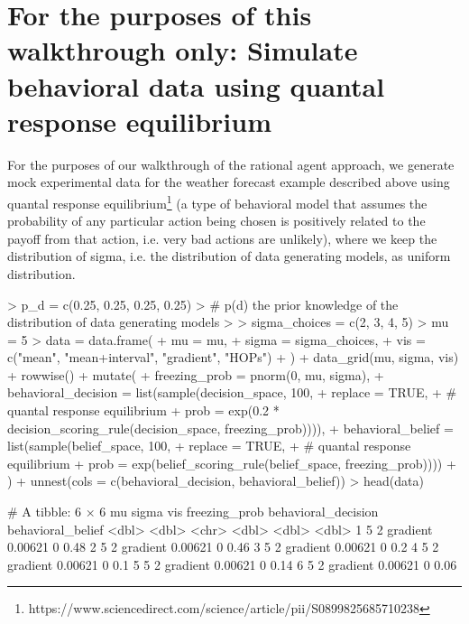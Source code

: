 \documentclass{article}
\begin{document}
\section{For the purposes of this walkthrough only: Simulate behavioral data using quantal response equilibrium}

For the purposes of our walkthrough of the rational agent approach, we generate mock experimental data for the weather forecast example described above using quantal response equilibrium\footnote{https://www.sciencedirect.com/science/article/pii/S0899825685710238} (a type of behavioral model that assumes the probability of any particular action being chosen is positively related to the payoff from that action, i.e. very bad actions are unlikely), where we keep the distribution of sigma, i.e. the distribution of data generating models, as uniform distribution.

\begin{Schunk}
\begin{Sinput}
> p_d = c(0.25, 0.25, 0.25, 0.25)
> # p(d) the prior knowledge of the distribution of data generating models
> 
> sigma_choices = c(2, 3, 4, 5)
> mu = 5
> data = data.frame(
+   mu = mu, 
+   sigma = sigma_choices,
+   vis = c("mean", "mean+interval", "gradient", "HOPs")
+ ) %>% 
+   data_grid(mu, sigma, vis) %>% 
+   rowwise() %>%
+   mutate(
+     freezing_prob = pnorm(0, mu, sigma),
+     behavioral_decision = list(sample(decision_space, 100, 
+       replace = TRUE, 
+       # quantal response equilibrium
+       prob = exp(0.2 * decision_scoring_rule(decision_space, freezing_prob)))),
+     behavioral_belief = list(sample(belief_space, 100, 
+       replace = TRUE, 
+       # quantal response equilibrium
+       prob = exp(belief_scoring_rule(belief_space, freezing_prob))))
+   ) %>%
+   unnest(cols = c(behavioral_decision, behavioral_belief))
> head(data)
\end{Sinput}
\begin{Soutput}
# A tibble: 6 × 6
     mu sigma vis      freezing_prob behavioral_decision behavioral_belief
  <dbl> <dbl> <chr>            <dbl>               <dbl>             <dbl>
1     5     2 gradient       0.00621                   0              0.48
2     5     2 gradient       0.00621                   0              0.46
3     5     2 gradient       0.00621                   0              0.2 
4     5     2 gradient       0.00621                   0              0.1 
5     5     2 gradient       0.00621                   0              0.14
6     5     2 gradient       0.00621                   0              0.06
\end{Soutput}
\end{Schunk}
\end{document}
